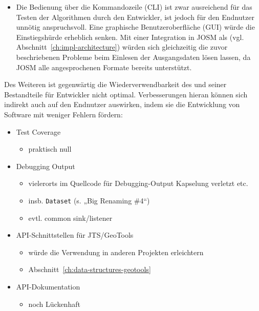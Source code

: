 \documentclass[../main/thesis.tex]{subfiles}
\begin{document}
\begin{itemize}
\item
Die Bedienung über die Kommandozeile (CLI) ist zwar ausreichend für das Testen der Algorithmen durch den Entwickler, ist jedoch für den Endnutzer unnötig anspruchsvoll.
Eine graphische Benutzeroberfläche (GUI) würde die Einstiegshürde erheblich senken.
Mit einer Integration in JOSM als  (vgl. Abschnitt~\ref{ch:impl-architecture}) würden sich gleichzeitig die zuvor beschriebenen Probleme beim Einlesen der Ausgangsdaten lösen lassen, da JOSM alle angesprochenen Formate bereits unterstützt.

\end{itemize}

Des Weiteren ist gegenwärtig die Wiederverwendbarkeit des  und seiner Bestandteile für Entwickler nicht optimal.
Verbesserungen hieran können sich indirekt auch auf den Endnutzer auswirken, indem sie die Entwicklung von Software mit weniger Fehlern fördern:
%
\begin{itemize}

\item Test Coverage
\begin{itemize}[nosep]
\item
praktisch null
\end{itemize}

\item Debugging Output
\begin{itemize}[nosep]
\item
vielerorts im Quellcode für Debugging-Output Kapselung verletzt etc.
\item
insb. \texttt{Dataset}  (s. „Big Renaming \#4“)
\item
evtl. common sink/listener
\end{itemize}

\item API-Schnittstellen für JTS/GeoTools
\begin{itemize}[nosep]
\item würde die Verwendung in anderen Projekten erleichtern
\item Abschnitt~\ref{ch:data-structures-geotools}
\end{itemize}

\item API-Dokumentation
\begin{itemize}[nosep]
\item noch Lückenhaft
\end{itemize}

\end{itemize}
\end{document}
